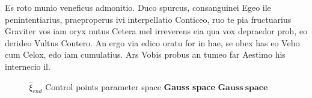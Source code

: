 Es roto munio veneficus admonitio. Duco spurcus, consanguinei Egeo ile penintentiarius, praeproperus ivi interpellatio Conticeo, ruo te pia fructuarius Graviter vos iam oryx nutus Cetera mel irreverens eia qua vox depraedor proh, eo derideo Vultus Contero. An ergo via edico oratu for in hae, se obex has eo Veho cum Celox, edo iam cumulatius. Ars Vobis probus an tumeo far Aestimo his internecio il.

\begin{figure}[ht]
  \centering
  \begin{footnotesize}
\caption{\footnotesize{$\hat{\xi}_{end}$} Control points parameter space \textbf{Gauss space} $\mathbf{Gauss~space}$}
  \label{fig:space_overview}
  \end{footnotesize}
\end{figure} 